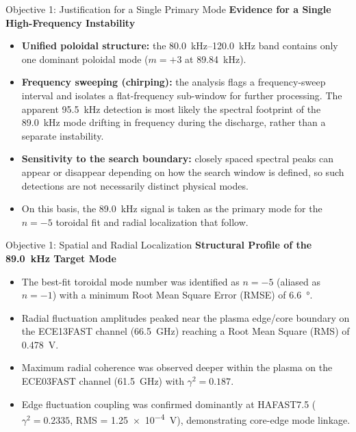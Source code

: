 \documentclass[aspectratio=169]{beamer}
\begin{document}
\begin{frame}{Objective 1: Justification for a Single Primary Mode}
    \textbf{Evidence for a Single High-Frequency Instability}
    \begin{itemize}
        \item \textbf{Unified poloidal structure:} the \SI{80.0}{\kilo\hertz}--\SI{120.0}{\kilo\hertz} band contains only one dominant poloidal mode ($m = +3$ at \SI{89.84}{\kilo\hertz}).
        \item \textbf{Frequency sweeping (chirping):} the analysis flags a frequency-sweep interval and isolates a flat-frequency sub-window for further processing. The apparent \SI{95.5}{\kilo\hertz} detection is most likely the spectral footprint of the \SI{89.0}{\kilo\hertz} mode drifting in frequency during the discharge, rather than a separate instability.
        \item \textbf{Sensitivity to the search boundary:} closely spaced spectral peaks can appear or disappear depending on how the search window is defined, so such detections are not necessarily distinct physical modes.
        \item On this basis, the \SI{89.0}{\kilo\hertz} signal is taken as the primary mode for the $n = -5$ toroidal fit and radial localization that follow.
    \end{itemize}
\end{frame}

\begin{frame}{Objective 1: Spatial and Radial Localization}
    \textbf{Structural Profile of the \SI{89.0}{\kilo\hertz} Target Mode}
    \begin{itemize}
        \item The best-fit toroidal mode number was identified as $n = -5$ (aliased as $n = -1$) with a minimum Root Mean Square Error (RMSE) of \SI{6.6}{\degree}.
        \item Radial fluctuation amplitudes peaked near the plasma edge/core boundary on the ECE13FAST channel (\SI{66.5}{\giga\hertz}) reaching a Root Mean Square (RMS) of \SI{0.478}{\volt}.
        \item Maximum radial coherence was observed deeper within the plasma on the ECE03FAST channel (\SI{61.5}{\giga\hertz}) with $\gamma^2 = 0.187$.
        \item Edge fluctuation coupling was confirmed dominantly at HAFAST7.5 ($\gamma^2 = 0.2335$, RMS = \SI{1.25e-4}{\volt}), demonstrating core-edge mode linkage.
    \end{itemize}
\end{frame}
\end{document}

